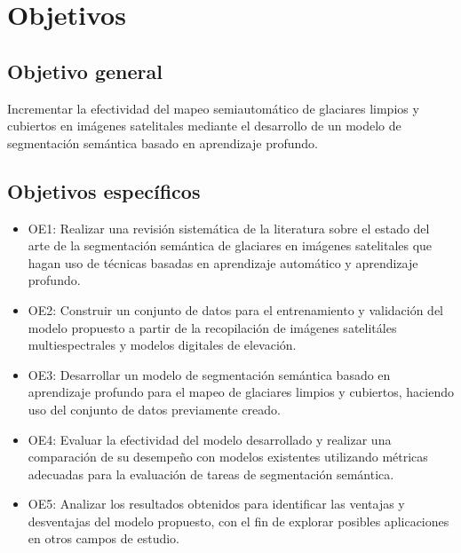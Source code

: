 \section{Objetivos}
\label{sec:Objetivos}

\subsection{Objetivo general}

Incrementar la efectividad del mapeo semiautomático de glaciares limpios y cubiertos en imágenes satelitales mediante el desarrollo de un modelo de segmentación semántica basado en aprendizaje profundo.

\subsection{Objetivos específicos}

\begin{itemize}
   \item OE1: Realizar una revisión sistemática de la literatura sobre el estado del arte de la segmentación semántica de glaciares en imágenes satelitales que hagan uso de técnicas basadas en aprendizaje automático y aprendizaje profundo.
   \item OE2: Construir un conjunto de datos para el entrenamiento y validación del modelo propuesto a partir de la recopilación de imágenes satelitáles multiespectrales y modelos digitales de elevación.
   \item OE3: Desarrollar un modelo de segmentación semántica basado en aprendizaje profundo para el mapeo de  glaciares limpios y cubiertos, haciendo uso del conjunto de datos previamente creado.
   \item OE4: Evaluar la efectividad del modelo desarrollado y realizar una comparación de su desempeño con modelos existentes utilizando métricas adecuadas para la evaluación de tareas de segmentación semántica.
   \item OE5: Analizar los resultados obtenidos para identificar las ventajas y desventajas del modelo propuesto, con el fin de explorar posibles aplicaciones en otros campos de estudio.
\end{itemize}